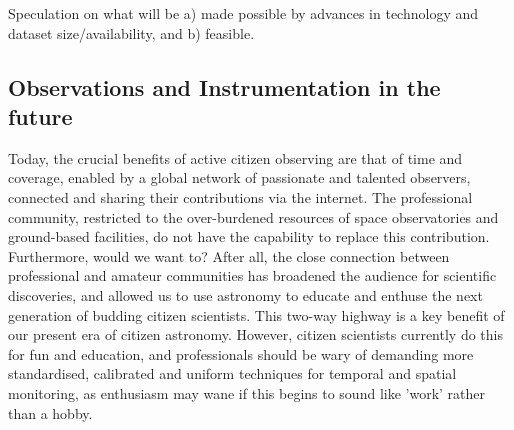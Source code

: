 \documentclass{ar2e}
\begin{document}
Speculation on what will be a) made possible by advances in technology and
dataset size/availability, and b) feasible.


\subsection{Observations and Instrumentation in the future}
\label{sec:future:obs}

% 
% 
% 
% 


Today, the crucial benefits of active citizen observing are that of time and
coverage, enabled by a global network of passionate and talented observers,
connected and sharing their contributions via the internet.  The professional
community, restricted to the over-burdened resources of space observatories
and ground-based facilities, do not have the capability to replace this
contribution. Furthermore, would we want to?  After all, the close connection
between professional and amateur communities has broadened the audience for
scientific discoveries, and allowed us to use astronomy to educate and enthuse
the next generation of budding citizen scientists.  This two-way highway is a
key benefit of our present era of citizen astronomy.  However, citizen
scientists currently do this for fun and education, and professionals should
be wary of demanding more standardised, calibrated and uniform techniques for
temporal and spatial monitoring, as enthusiasm may wane if this begins to
sound like 'work' rather than a hobby.
\end{document}
